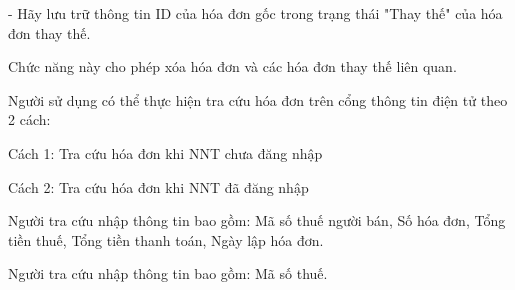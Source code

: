 - Hãy lưu trữ thông tin ID của hóa đơn gốc trong trạng thái "Thay thế" của hóa đơn thay thế.


Chức năng này cho phép xóa hóa đơn và các hóa đơn thay thế liên quan.


Người sử dụng có thể thực hiện tra cứu hóa đơn trên cổng thông tin điện tử theo 2 cách:

Cách 1: Tra cứu hóa đơn khi NNT chưa đăng nhập

Cách 2: Tra cứu hóa đơn khi NNT đã đăng nhập



Người tra cứu nhập thông tin bao gồm: Mã số thuế người bán, Số hóa đơn, Tổng tiền thuế, Tổng tiền thanh toán, Ngày lập hóa đơn.






Người tra cứu nhập thông tin bao gồm: Mã số thuế.





